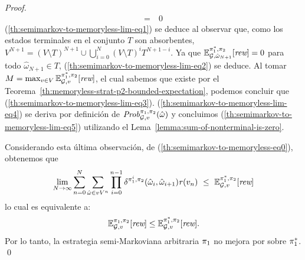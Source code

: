 \begin{proof}
\begin{align}
    = \ & 0  \label{th:semimarkov-to-memoryless-lim-eq5}
  \end{align}
  (\ref{th:semimarkov-to-memoryless-lim-eq1}) se deduce al observar que,
  como los estados terminales en el conjunto $T$ son absorbentes,
  $V^{N+1}=(V\setminus T)^{N+1}\cup\bigcup_{i=0}^N(V\setminus T)^iT^{N+1-i}$.
  Ya que
  $\mathbb{E}^{\pi^*_{1}, \pi_{2}}_{\mathcal{G}, \hat{\omega}_{N+1}}[\textit{rew}]=0$
  para todo $\hat{\omega}_{N+1}\in T$, (\ref{th:semimarkov-to-memoryless-lim-eq2})
  se deduce.
  Al tomar
  $M = \max_{v\in V} \mathbb{E}^{\pi^*_{1}, \pi_{2}}_{\mathcal{G}, v}[\textit{rew}]$,
  el cual sabemos que existe por el Teorema~\ref{th:memoryless-strat-p2-bounded-expectation}, podemos concluir que
  (\ref{th:semimarkov-to-memoryless-lim-eq3}).
  (\ref{th:semimarkov-to-memoryless-lim-eq4}) se deriva por definición de
  $\mathit{Prob}^{\pi_{1}, \pi_{2}}_{\mathcal{G},v}(\hat{\omega})$ y concluimos
  (\ref{th:semimarkov-to-memoryless-lim-eq5}) utilizando
  el Lema~\ref{lemma:sum-of-nonterminal-is-zero}.
  

  Considerando esta última observación, de
  (\ref{th:semimarkov-to-memoryless-eq0}), obtenemos que
  \[
  \lim_{N \rightarrow \infty}	\sum^{N}_{n=0}\sum_{\hat{\omega} \in vV^{n}} \prod^{n-1}_{i=0}\delta^{\strat{1}^i,\strat{2}}(\hat{\omega}_i, \hat{\omega}_{i+1}) \reward(v_n) \ \leq \ \Expect{\starredstrat{1}}{\strat{2}}_{\StochG,v}[\Rewards]
  \]
  lo cual es equivalente a:
  \[
  \mathbb{E}^{\pi_{1}, \pi_{2}}_{\mathcal{G},v}[\textit{rew}] \leq \mathbb{E}^{\pi^*_{1}, \pi_{2}}_{\mathcal{G},v}[\textit{rew}].
  \]
  Por lo tanto, la estrategia semi-Markoviana arbitraria $\pi_{1}$ no mejora por sobre $\pi^*_{1}$.
  \qed
\end{proof}

